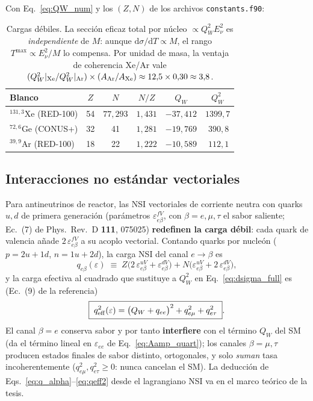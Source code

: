 \documentclass[11pt,a4paper]{article}
\newcommand{\eps}{\varepsilon}
\newcommand{\QW}{Q_{W}}
\newcommand{\Enu}{E_{\nu}}
\newcommand{\Tnr}{T}
\newcommand{\qeff}{q_{\rm eff}}
\newcommand{\code}[1]{\texttt{#1}}
\newcommand{\dd}{\mathrm{d}}
\begin{document}
Con Eq.~\eqref{eq:QW_num} y los $(Z,N)$ de los archivos \code{constants.f90}:

\begin{table}[h]
\centering
\begin{tabular}{@{}lccccc@{}}
\toprule
Blanco & $Z$ & $N$ & $N/Z$ & $\QW$ & $\QW^{2}$ \\
\midrule
$^{131{,}3}$Xe (RED-100) & 54 & $77{,}293$ & $1{,}431$ & $-37{,}412$ & $1399{,}7$ \\
$^{72{,}6}$Ge (CONUS+)   & 32 & 41 & $1{,}281$ & $-19{,}769$ & $\ 390{,}8$ \\
$^{39{,}9}$Ar (RED-100)  & 18 & 22 & $1{,}222$ & $-10{,}589$ & $\ 112{,}1$ \\
\bottomrule
\end{tabular}
\caption{Cargas d\'ebiles. La secci\'on eficaz total por n\'ucleo
$\propto \QW^{2}\Enu^{2}$ es \emph{independiente} de $M$: aunque
$\dd\sigma/\dd\Tnr\propto M$, el rango $\Tnr^{\max}\propto\Enu^{2}/M$ lo
compensa. Por unidad de masa, la ventaja de coherencia Xe/Ar vale
$(\QW^{2}|_{\rm Xe}/\QW^{2}|_{\rm Ar})\times(A_{\rm Ar}/A_{\rm Xe})
\approx 12{,}5\times 0{,}30 \approx 3{,}8$.}
\label{tab:qw}
\end{table}

\subsection{Interacciones no est\'andar vectoriales}
\label{sec:marco_nsi}

Para antineutrinos de reactor, las NSI vectoriales de corriente neutra con
quarks $u,d$ de primera generaci\'on (par\'ametros $\eps_{e\beta}^{fV}$, con
$\beta=e,\mu,\tau$ el sabor saliente; Ec.~(7) de Phys.\ Rev.\ D \textbf{111},
075025) \textbf{redefinen la carga d\'ebil}: cada quark de valencia a\~nade
$2\,\eps_{e\beta}^{fV}$ a su acoplo vectorial. Contando quarks por nucle\'on
($p=2u{+}1d$, $n=1u{+}2d$), la carga NSI del canal $e\to\beta$ es
\begin{equation}
  \label{eq:q_alpha}
  q_{e\beta}(\eps)
  \;\equiv\;
  Z\bigl(2\,\eps_{e\beta}^{uV} + \eps_{e\beta}^{dV}\bigr)
  + N\bigl(\eps_{e\beta}^{uV} + 2\,\eps_{e\beta}^{dV}\bigr),
\end{equation}
y la carga efectiva al cuadrado que sustituye a $\QW^{2}$ en
Eq.~\eqref{eq:dsigma_full} es (Ec.~(9) de la referencia)
\begin{equation}
  \label{eq:qeff2}
  \boxed{\;
  \qeff^{2}(\eps)
  = \bigl(\QW + q_{ee}\bigr)^{2}
  + q_{e\mu}^{2}
  + q_{e\tau}^{2}\; }.
\end{equation}
El canal $\beta=e$ conserva sabor y por tanto \textbf{interfiere} con el
t\'ermino $\QW$ del SM (da el t\'ermino lineal en $\eps_{ee}$ de
Eq.~\eqref{eq:Aamp_quart}); los canales $\beta=\mu,\tau$ producen estados
finales de sabor distinto, ortogonales, y solo \emph{suman} tasa
incoherentemente ($q_{e\mu}^{2},q_{e\tau}^{2}\ge 0$: nunca cancelan el SM). La
deducci\'on de Eqs.~\eqref{eq:q_alpha}--\eqref{eq:qeff2} desde el lagrangiano
NSI va en el marco te\'orico de la tesis.
\end{document}
